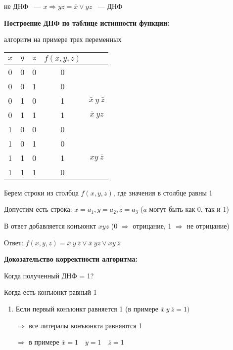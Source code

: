 \documentclass[russian]{lecture-notes}
\begin{document}
\begin{sloppypar}
\begin{example}
	не ДНФ ~--- $x \Rightarrow yz = \overline{x} \lor yz$ ~---  ДНФ
\end{example}

\textbf{Построение ДНФ по таблице истинности функции:}

	алгоритм на примере трех переменных

\begin{table}[h!]
	\centering
	\begin{tabular}{|c|c|c|c|c|}
		\hline
		$x$ & $y$ & $z$ & $f(x, y ,z)$ &     \\ \hline
		0 & 0 & 0 & 0 &     \\ \hline
		0 & 0 & 1 & 0 &     \\ \hline
		0 & 1 & 0 & 1 & $\overline{x} \: y \: \overline{z}$ \\ \hline
		0 & 1 & 1 & 1 & $\overline{x} \: yz$ \\ \hline
		1 & 0 & 0 & 0 &     \\ \hline
		1 & 0 & 1 & 0 &     \\ \hline
		1 & 1 & 0 & 1 & $xy \: \overline{z}$ \\ \hline
		1 & 1 & 1 & 0 &     \\ \hline
	\end{tabular}
\end{table}

	Берем строки из столбца $f(x, y, z)$, где значения в столбце равны 1
	
	Допустим есть строка: $x = a_1, y = a_2, z = a_3$ ($a$ могут быть как 0, так и 1)
	
	В ответ добавляется конъюнкт $xyz$ (0 $\Rightarrow$ отрицание, 1 $\Rightarrow$ не отрицание)
	
	Ответ: $f(x, y, z) = \overline{x} \: y \: \overline{z} \lor \overline{x} \: yz \lor xy \: \overline{z}$

\textbf{Докозательство корректности алгоритма:}

Когда полученный ДНФ = 1?

Когда есть конъюнкт равный 1

\begin{enumerate}
	\item{
		Если первый конъюнкт равняется 1 (в примере 	$\overline{x} \: y \: \overline{z}  = 1)$ 

		$\Rightarrow $ все литералы конъюнкта равняются 1

		$\Rightarrow$ в примере $\overline{x} = 1 \quad y = 1 \quad \overline{z} = 1$

}
\end{enumerate}
\end{sloppypar}
\end{document}
